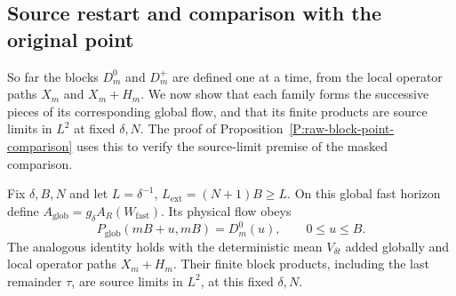 \subsection{Source restart and comparison with the original point}

So far the blocks $D_m^0$ and $D_m^+$ are defined one at a time, from the local
operator paths $X_m$ and $X_m+H_m$. We now show that each family forms the
successive pieces of its corresponding global flow, and that its finite
products are source limits in $L^2$ at fixed $\delta,N$. The proof of
Proposition~\ref{P:raw-block-point-comparison} uses this to verify the
source-limit premise of the masked comparison.

\begin{lemma}
  \label{L:raw-block-restart}
  Fix $\delta,B,N$ and let $L = \delta^{-1}$, $L_{\mathrm{ext}} = (N+1)B \ge L$.
  On this global fast horizon define $A_{\mathrm{glob}} = g_\delta
  A_R(W_{\mathrm{fast}})$. Its physical flow obeys
  \begin{equation}\label{E:raw-block-restart}
    P_{\mathrm{glob}}(mB+u,mB)=D_m^0(u),\qquad 0\le u\le B.
  \end{equation}
  The analogous identity holds with the deterministic mean $V_{\delta t}$ added
  globally and local operator paths $X_m+H_m$. Their finite block products,
  including the last remainder $\tau$, are source limits in $L^2$, at this fixed
  $\delta,N$.
\end{lemma}

